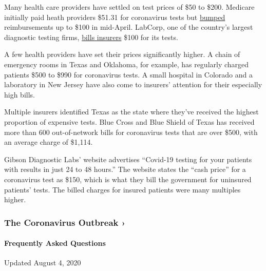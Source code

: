 Many health care providers have settled on test prices of \$50 to \$200.
Medicare initially paid heath providers \$51.31 for coronavirus tests
but
\href{https://www.cms.gov/newsroom/press-releases/cms-increases-medicare-payment-high-production-coronavirus-lab-tests-0}{bumped}
reimbursements up to \$100 in mid-April. LabCorp, one of the country's
largest diagnostic testing firms,
\href{https://www.labcorp.com/coronavirus-disease-covid-19/health-plan-information}{bills
insurers} \$100 for its tests.

A few health providers have set their prices significantly higher. A
chain of emergency rooms in Texas and Oklahoma, for example, has
regularly charged patients \$500 to \$990 for coronavirus tests. A small
hospital in Colorado and a laboratory in New Jersey have also come to
insurers' attention for their especially high bills.

Multiple insurers identified Texas as the state where they've received
the highest proportion of expensive tests. Blue Cross and Blue Shield of
Texas has received more than 600 out-of-network bills for coronavirus
tests that are over \$500, with an average charge of \$1,114.

Gibson Diagnostic Labs' website advertises ``Covid-19 testing for your
patients with results in just 24 to 48 hours.'' The website states the
``cash price'' for a coronavirus test as \$150, which is what they bill
the government for uninsured patients' tests. The billed charges for
insured patients were many multiples higher.

\href{https://www.nytimes.com/news-event/coronavirus?action=click\&pgtype=Article\&state=default\&region=MAIN_CONTENT_3\&context=storylines_faq}{}

\hypertarget{the-coronavirus-outbreak-}{%
\subsubsection{The Coronavirus Outbreak
›}\label{the-coronavirus-outbreak-}}

\hypertarget{frequently-asked-questions}{%
\paragraph{Frequently Asked
Questions}\label{frequently-asked-questions}}

Updated August 4, 2020

